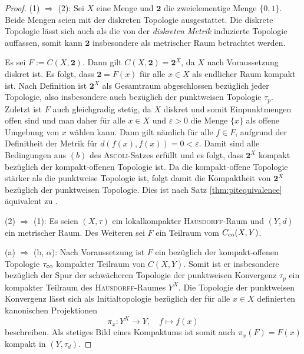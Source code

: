 \begin{proof}
  (1) $\Rightarrow$ (2): Sei $X$ eine Menge und $\mathbf{2}$ die zweielementige Menge $\{0,1\}$. Beide Mengen seien  mit der diskreten Topologie ausgestattet. 
  Die diskrete Topologie lässt sich auch als die von der \textit{diskreten Metrik} induzierte Topologie auffassen, somit kann $\mathbf{2}$ insbesondere als metrischer Raum betrachtet werden. 

  Es sei $F := C(X, \mathbf{2})$.
  Dann gilt $C(X, \mathbf{2}) = \mathbf{2}^X$, da $X$ nach Voraussetzung diskret ist.
  Es folgt, dass $\mathbf{2} = F(x)$ für alle $x \in X$ als endlicher Raum kompakt ist.
  Nach Definition ist $\mathbf{2}^X$ als Gesamtraum abgeschlossen bezüglich jeder Topologie, also insbesondere auch bezüglich der punktweisen Topologie $\tau_p$.
  Zuletzt ist $F$ auch gleichgradig stetig, da $X$ diskret und somit Einpunktmengen offen sind und man daher für alle $x \in X$ und $\varepsilon > 0$ die Menge $\{x\}$ als offene Umgebung von $x$ wählen kann.
  Dann gilt nämlich für alle $f \in F$, aufgrund der Definitheit der Metrik für  $d(f(x),f(x)) = 0 < \varepsilon$.
  Damit sind alle Bedingungen aus $(b)$ des \textsc{Ascoli}\hyp{}Satzes erfüllt und es folgt, dass $\mathbf{2}^X$ kompakt bezüglich der kompakt\hyp{}offenen Topologie ist.
  Da die kompakt\hyp{}offene Topologie stärker als die punktweise Topologie ist, folgt damit die Kompaktheit von $\mathbf{2}^X$ bezüglich der punktweisen Topologie.
  Dies ist nach Satz \ref{thm:pitequivalence} äquivalent zu \PIT.

  (2) $\Rightarrow$ (1): Es seien $(X,\tau)$ ein lokalkompakter \textsc{Hausdorff}\hyp{}Raum und $(Y,d)$ ein metrischer Raum.
  Des Weiteren sei $F$ ein Teilraum vom $C_{\mathrm{co}}(X,Y)$.

  (a) $\Rightarrow$ (b, $\alpha$): 
  Nach Voraussetzung ist $F$ ein bezüglich der kompakt\hyp{}offenen Topologie $\tau_{\mathrm{co}}$ kompakter Teilraum von $C(X,Y)$.
  Somit ist er insbesondere bezüglich der Spur der schwächeren Topologie der punktweisen Konvergenz $\tau_p$ ein kompakter Teilraum des \textsc{Hausdorff}\hyp{}Raumes $Y^X$.
  Die Topologie der punktweisen Konvergenz lässt sich als Initialtopologie bezüglich der für alle $x \in X$ definierten kanonischen Projektionen 
  \begin{displaymath}
    \pi_x : Y^X \to Y, \quad f \mapsto f(x)
  \end{displaymath}
  beschreiben.
  Als stetiges Bild eines Kompaktums ist somit auch $\pi_x(F) = F(x)$ kompakt in $(Y,\tau_d)$.


\end{proof}
